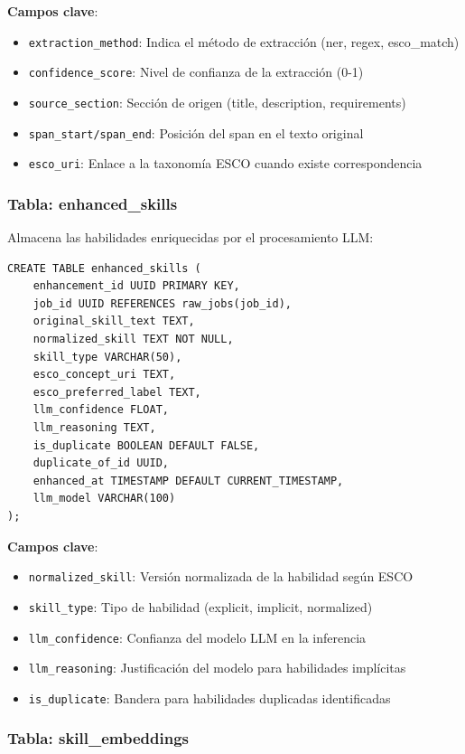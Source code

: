 \textbf{Campos clave}:
\begin{itemize}
    \item \texttt{extraction\_method}: Indica el método de extracción (ner, regex, esco\_match)
    \item \texttt{confidence\_score}: Nivel de confianza de la extracción (0-1)
    \item \texttt{source\_section}: Sección de origen (title, description, requirements)
    \item \texttt{span\_start/span\_end}: Posición del span en el texto original
    \item \texttt{esco\_uri}: Enlace a la taxonomía ESCO cuando existe correspondencia
\end{itemize}

\subsubsection{Tabla: enhanced\_skills}

Almacena las habilidades enriquecidas por el procesamiento LLM:

\begin{verbatim}
CREATE TABLE enhanced_skills (
    enhancement_id UUID PRIMARY KEY,
    job_id UUID REFERENCES raw_jobs(job_id),
    original_skill_text TEXT,
    normalized_skill TEXT NOT NULL,
    skill_type VARCHAR(50),
    esco_concept_uri TEXT,
    esco_preferred_label TEXT,
    llm_confidence FLOAT,
    llm_reasoning TEXT,
    is_duplicate BOOLEAN DEFAULT FALSE,
    duplicate_of_id UUID,
    enhanced_at TIMESTAMP DEFAULT CURRENT_TIMESTAMP,
    llm_model VARCHAR(100)
);
\end{verbatim}

\textbf{Campos clave}:
\begin{itemize}
    \item \texttt{normalized\_skill}: Versión normalizada de la habilidad según ESCO
    \item \texttt{skill\_type}: Tipo de habilidad (explicit, implicit, normalized)
    \item \texttt{llm\_confidence}: Confianza del modelo LLM en la inferencia
    \item \texttt{llm\_reasoning}: Justificación del modelo para habilidades implícitas
    \item \texttt{is\_duplicate}: Bandera para habilidades duplicadas identificadas
\end{itemize}

\subsubsection{Tabla: skill\_embeddings}

